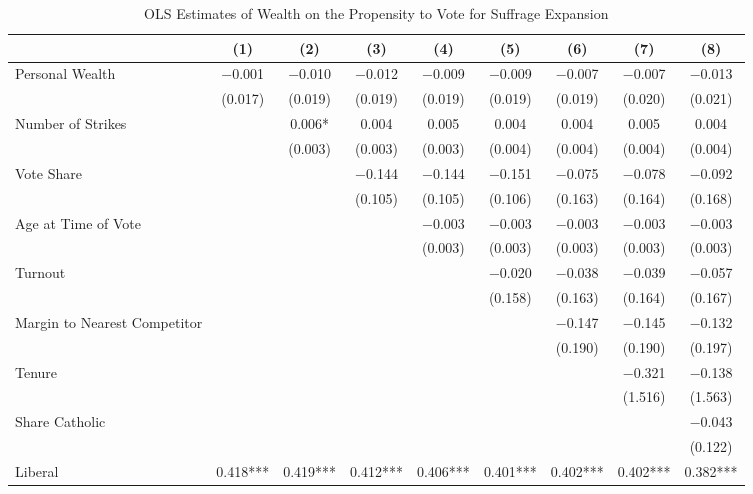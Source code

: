 \begin{table}

\caption{\label{tab:baseline_ols_suffrage}OLS Estimates of Wealth on the Propensity to Vote for Suffrage Expansion}
\centering
\begin{tabular}[t]{lcccccccc}
\toprule
  & (1) & (2) & (3) & (4) & (5) & (6) & (7) & (8)\\
\midrule
Personal Wealth & \num{-0.001} & \num{-0.010} & \num{-0.012} & \num{-0.009} & \num{-0.009} & \num{-0.007} & \num{-0.007} & \num{-0.013}\\
 & (\num{0.017}) & (\num{0.019}) & (\num{0.019}) & (\num{0.019}) & (\num{0.019}) & (\num{0.019}) & (\num{0.020}) & (\num{0.021})\\
Number of Strikes &  & \num{0.006}* & \num{0.004} & \num{0.005} & \num{0.004} & \num{0.004} & \num{0.005} & \num{0.004}\\
 &  & (\num{0.003}) & (\num{0.003}) & (\num{0.003}) & (\num{0.004}) & (\num{0.004}) & (\num{0.004}) & (\num{0.004})\\
Vote Share &  &  & \num{-0.144} & \num{-0.144} & \num{-0.151} & \num{-0.075} & \num{-0.078} & \num{-0.092}\\
 &  &  & (\num{0.105}) & (\num{0.105}) & (\num{0.106}) & (\num{0.163}) & (\num{0.164}) & (\num{0.168})\\
Age at Time of Vote &  &  &  & \num{-0.003} & \num{-0.003} & \num{-0.003} & \num{-0.003} & \num{-0.003}\\
 &  &  &  & (\num{0.003}) & (\num{0.003}) & (\num{0.003}) & (\num{0.003}) & (\num{0.003})\\
Turnout &  &  &  &  & \num{-0.020} & \num{-0.038} & \num{-0.039} & \num{-0.057}\\
 &  &  &  &  & (\num{0.158}) & (\num{0.163}) & (\num{0.164}) & (\num{0.167})\\
Margin to Nearest Competitor &  &  &  &  &  & \num{-0.147} & \num{-0.145} & \num{-0.132}\\
 &  &  &  &  &  & (\num{0.190}) & (\num{0.190}) & (\num{0.197})\\
Tenure &  &  &  &  &  &  & \num{-0.321} & \num{-0.138}\\
 &  &  &  &  &  &  & (\num{1.516}) & (\num{1.563})\\
Share Catholic &  &  &  &  &  &  &  & \num{-0.043}\\
 &  &  &  &  &  &  &  & (\num{0.122})\\
Liberal & \num{0.418}*** & \num{0.419}*** & \num{0.412}*** & \num{0.406}*** & \num{0.401}*** & \num{0.402}*** & \num{0.402}*** & \num{0.382}***\\

\end{tabular}
\end{table}
